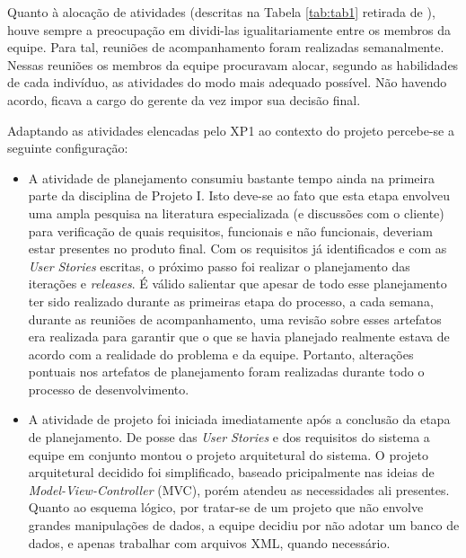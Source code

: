Quanto à alocação de atividades (descritas na Tabela \ref{tab:tab1} retirada de \cite{xp1}), houve sempre a preocupação em dividi-las igualitariamente entre os membros da equipe. Para tal, reuniões de acompanhamento foram realizadas semanalmente. Nessas reuniões os membros da equipe procuravam alocar, segundo as habilidades de cada indivíduo, as atividades do modo mais adequado possível. Não havendo acordo, ficava a cargo do gerente da vez impor sua decisão final.

Adaptando as atividades elencadas pelo XP1 ao contexto do projeto percebe-se a seguinte configuração: 
\begin{itemize}
 \item  A atividade de planejamento consumiu bastante tempo ainda na primeira parte da disciplina de Projeto I. Isto deve-se ao fato que esta etapa envolveu uma ampla pesquisa na literatura especializada (e discussões com o cliente) para verificação de quais requisitos, funcionais e não funcionais, deveriam estar presentes no produto final. Com os requisitos já identificados e com as \textit{User Stories} escritas, o próximo passo foi realizar o planejamento das iterações e \textit{releases}. É válido salientar que apesar de todo esse planejamento ter sido realizado durante as primeiras etapa do processo, a cada semana, durante as reuniões de acompanhamento, uma revisão sobre esses artefatos era realizada para garantir que o que se havia planejado realmente estava de acordo com a realidade do problema e da equipe. Portanto, alterações pontuais nos artefatos de planejamento foram realizadas durante todo o processo de desenvolvimento.
 \item A atividade de projeto foi iniciada imediatamente após a conclusão da etapa de planejamento. De posse das \textit{User Stories} e dos requisitos do sistema a equipe em conjunto montou o projeto arquitetural do sistema. O projeto arquitetural decidido foi simplificado, baseado pricipalmente nas ideias de \textit{Model-View-Controller} (MVC), porém atendeu as necessidades ali presentes. Quanto ao esquema lógico, por tratar-se de um projeto que não envolve grandes manipulações de dados, a equipe decidiu por não adotar um banco de dados, e apenas trabalhar com arquivos XML, quando necessário.

\end{itemize}
